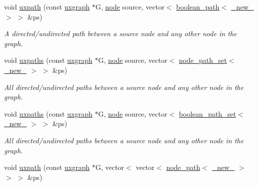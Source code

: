 \begin{DoxyCompactItemize}
void \hyperlink{namespacelgraph_1_1traversal_ad5c153d51abaa62dc1da6fe47302fabf}{uxpath} (const \hyperlink{classlgraph_1_1utils_1_1uxgraph}{uxgraph} $\ast$G, \hyperlink{namespacelgraph_1_1utils_ab9c6b34241f0b68372c55f34c460e863}{node} source, vector$<$ \hyperlink{classlgraph_1_1utils_1_1boolean__path}{boolean\+\_\+path}$<$ \hyperlink{namespacelgraph_1_1utils_a2c84bfde888c42ab3ad6b2cb8a364240}{\+\_\+new\+\_\+} $>$ $>$ \&ps)
\begin{DoxyCompactList}\small\item\em A directed/undirected path between a source node and any other node in the graph. \end{DoxyCompactList}\item 
void \hyperlink{namespacelgraph_1_1traversal_a9761cc456130e95d8a883d14854a0c44}{uxpaths} (const \hyperlink{classlgraph_1_1utils_1_1uxgraph}{uxgraph} $\ast$G, \hyperlink{namespacelgraph_1_1utils_ab9c6b34241f0b68372c55f34c460e863}{node} source, vector$<$ \hyperlink{namespacelgraph_1_1utils_a723c115f9865edfab11a90377b9abef4}{node\+\_\+path\+\_\+set}$<$ \hyperlink{namespacelgraph_1_1utils_a2c84bfde888c42ab3ad6b2cb8a364240}{\+\_\+new\+\_\+} $>$ $>$ \&ps)
\begin{DoxyCompactList}\small\item\em All directed/undirected paths between a source node and any other node in the graph. \end{DoxyCompactList}\item 
void \hyperlink{namespacelgraph_1_1traversal_a8f2b9cea0611501020f210a067878f2c}{uxpaths} (const \hyperlink{classlgraph_1_1utils_1_1uxgraph}{uxgraph} $\ast$G, \hyperlink{namespacelgraph_1_1utils_ab9c6b34241f0b68372c55f34c460e863}{node} source, vector$<$ \hyperlink{namespacelgraph_1_1utils_aaf50131e15d771a45620336d6e7a77f8}{boolean\+\_\+path\+\_\+set}$<$ \hyperlink{namespacelgraph_1_1utils_a2c84bfde888c42ab3ad6b2cb8a364240}{\+\_\+new\+\_\+} $>$ $>$ \&ps)
\begin{DoxyCompactList}\small\item\em All directed/undirected paths between a source node and any other node in the graph. \end{DoxyCompactList}\item 
void \hyperlink{namespacelgraph_1_1traversal_a42e351d7e0c1943141917348116f5f32}{uxpath} (const \hyperlink{classlgraph_1_1utils_1_1uxgraph}{uxgraph} $\ast$G, vector$<$ vector$<$ \hyperlink{classlgraph_1_1utils_1_1node__path}{node\+\_\+path}$<$ \hyperlink{namespacelgraph_1_1utils_a2c84bfde888c42ab3ad6b2cb8a364240}{\+\_\+new\+\_\+} $>$ $>$ $>$ \&ps)

\end{DoxyCompactItemize}
